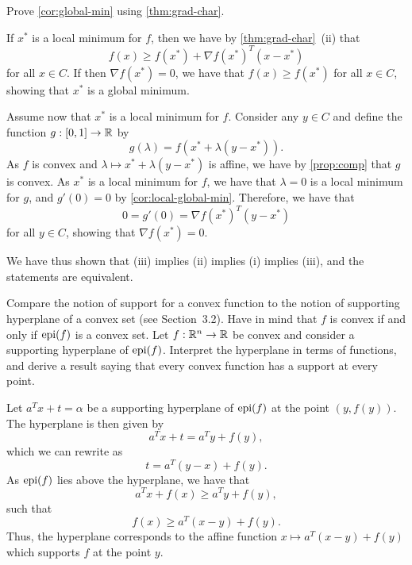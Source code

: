 \begin{exercise}
  Prove \cref{cor:global-min} using \cref{thm:grad-char}.
\end{exercise}

\begin{solution}
  If $x^*$ is a local minimum for $f$, then we have by \cref{thm:grad-char}~(ii) that
  \begin{equation}
    f(x) \geq f(x^*) + \nabla f(x^*)^T (x - x^*)
  \end{equation}
  for all $x \in C$.
  If then $\nabla f(x^*) = 0$, we have that $f(x) \geq f(x^*)$ for all $x \in C$, showing that $x^*$ is a global minimum.

  Assume now that $x^*$ is a local minimum for $f$.
  Consider any $y \in C$ and define the function $g : [0, 1] \to \mathbb{R}$ by
  \begin{equation}
    g(\lambda) = f( x^* + \lambda (y - x^*) ).
  \end{equation}
  As $f$ is convex and $\lambda \mapsto x^* + \lambda (y - x^*)$ is affine, we have by \cref{prop:comp} that $g$ is convex.
  As $x^*$ is a local minimum for $f$, we have that $\lambda = 0$ is a local minimum for $g$, and $g'(0) = 0$ by \cref{cor:local-global-min}.
  Therefore, we have that
  \begin{equation}
    0 = g'(0) = \nabla f(x^*)^T (y - x^*)
  \end{equation}
  for all $y \in C$, showing that $\nabla f(x^*) = 0$.

  We have thus shown that (iii) implies (ii) implies (i) implies (iii), and the statements are equivalent.
\end{solution}

\begin{exercise}
  Compare the notion of support for a convex function to the notion of supporting hyperplane of a convex set (see Section~3.2).
  Have in mind that $f$ is convex if and only if $\operatorname*{epi}(f)$ is a convex set.
  Let $f : \mathbb{R}^n \to \mathbb{R}$ be convex and consider a supporting hyperplane of $\operatorname*{epi}(f)$.
  Interpret the hyperplane in terms of functions, and derive a result saying that every convex function has a support at every point.
\end{exercise}

\begin{solution}
  Let $a^T x + t = \alpha$ be a supporting hyperplane of $\operatorname*{epi}(f)$ at the point $(y, f(y))$.
  The hyperplane is then given by
  \begin{equation}
    a^T x + t = a^T y + f(y),
  \end{equation}
  which we can rewrite as
  \begin{equation}
    t = a^T (y - x) + f(y).
  \end{equation}
  As $\operatorname*{epi}(f)$ lies above the hyperplane, we have that
  \begin{equation}
    a^T x + f(x) \geq a^T y + f(y),
  \end{equation}
  such that
  \begin{equation}
    f(x) \geq a^T (x - y) + f(y).
  \end{equation}
  Thus, the hyperplane corresponds to the affine function $x \mapsto a^T (x - y) + f(y)$ which supports $f$ at the point $y$.
\end{solution}
